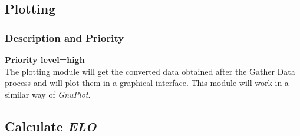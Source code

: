 \documentclass{scrreprt}
\begin{document}
\subsection{Plotting}
\subsubsection{Description and Priority}
\textbf{Priority level=high}\\
The plotting module will get the converted data obtained after the Gather Data process and will plot them in a graphical interface. This module will work in a similar way of \textit{GnuPlot}.

\subsection{Calculate \textit{\textbf{ELO}}}
\end{document}

